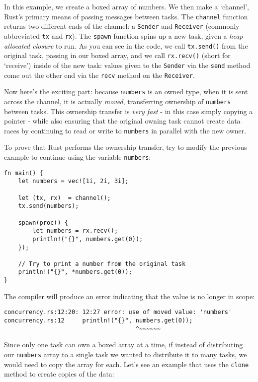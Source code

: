 \documentclass[]{article}
\begin{document}
In this example, we create a boxed array of numbers. We then make a
`channel', Rust's primary means of passing messages between tasks. The
\texttt{channel} function returns two different ends of the channel: a
\texttt{Sender} and \texttt{Receiver} (commonly abbreviated \texttt{tx}
and \texttt{rx}). The \texttt{spawn} function spins up a new task, given
a \emph{heap allocated closure} to run. As you can see in the code, we
call \texttt{tx.send()} from the original task, passing in our boxed
array, and we call \texttt{rx.recv()} (short for `receive') inside of
the new task: values given to the \texttt{Sender} via the \texttt{send}
method come out the other end via the \texttt{recv} method on the
\texttt{Receiver}.

Now here's the exciting part: because \texttt{numbers} is an owned type,
when it is sent across the channel, it is actually \emph{moved},
transferring ownership of \texttt{numbers} between tasks. This ownership
transfer is \emph{very fast} - in this case simply copying a pointer -
while also ensuring that the original owning task cannot create data
races by continuing to read or write to \texttt{numbers} in parallel
with the new owner.

To prove that Rust performs the ownership transfer, try to modify the
previous example to continue using the variable \texttt{numbers}:

\begin{verbatim}
fn main() {
    let numbers = vec![1i, 2i, 3i];

    let (tx, rx)  = channel();
    tx.send(numbers);

    spawn(proc() {
        let numbers = rx.recv();
        println!("{}", numbers.get(0));
    });

    // Try to print a number from the original task
    println!("{}", *numbers.get(0));
}
\end{verbatim}

The compiler will produce an error indicating that the value is no
longer in scope:

\begin{verbatim}
concurrency.rs:12:20: 12:27 error: use of moved value: 'numbers'
concurrency.rs:12     println!("{}", numbers.get(0));
                                     ^~~~~~~
\end{verbatim}

Since only one task can own a boxed array at a time, if instead of
distributing our \texttt{numbers} array to a single task we wanted to
distribute it to many tasks, we would need to copy the array for each.
Let's see an example that uses the \texttt{clone} method to create
copies of the data:
\end{document}
